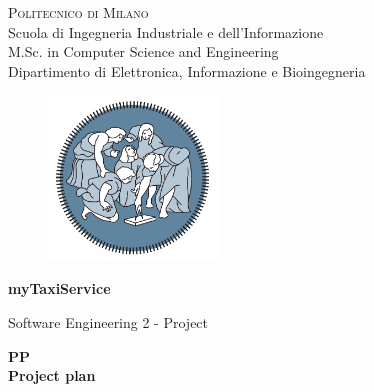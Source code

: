 \begin{titlepage}

\begin{center}
\Large{\textsc{Politecnico di Milano}}\\
\Large{Scuola di Ingegneria Industriale e dell'Informazione}\\
\large{M.Sc. in Computer Science and Engineering}\\
\large{Dipartimento di Elettronica, Informazione e Bioingegneria}
\par\end{center}

\vspace{0.3cm}


\begin{center}
\begin{figure}[h]
\centering{}\includegraphics[width=0.4\textwidth]{title-page/logo}
\end{figure}
\vspace{0.4cm}

\par\end{center}

\begin{center}
\huge{\textbf{myTaxiService}}\\
\vspace{0.2cm}

\par\end{center}

\begin{center}
\Large{Software Engineering 2 - Project}
\par\end{center}

\begin{center}
\vspace{0.9cm}
\Huge{\textbf{PP}}\\
\Large{\textbf{Project plan}}
\par\end{center}


\end{titlepage}
